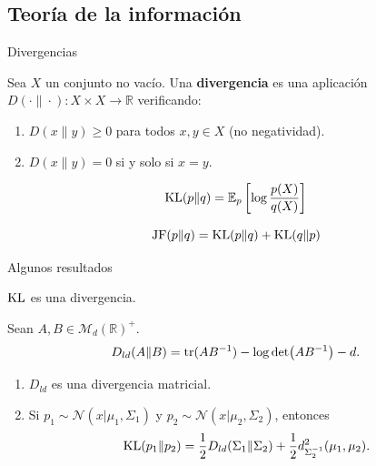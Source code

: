 \documentclass[10pt, compress]{beamer}
\newcommand\R{\mathbb{R}}
\begin{document}
\subsection{Teoría de la información}

\begin{frame}{Divergencias}
  \begin{definition}[Divergencia]
    Sea $X$ un conjunto no vacío. Una \textbf{divergencia} es una aplicación $D(\cdot \| \cdot ) \colon X \times X \to \R$ verificando:
    \begin{enumerate}
      \item $D(x \| y ) \ge 0$ para todos $x, y \in X$ (no negatividad).
      \item $D(x \| y ) = 0$ si y solo si $x = y$. 
    \end{enumerate}
  \end{definition}

  \begin{definition}
    \[\operatorname{KL}(p \| q) = \mathbb{E}_p\left[ \log\frac{p(X)}{q(X)} \right]\]
  \end{definition}

  \begin{definition}
    \[\operatorname{JF}(p \| q) = \operatorname{KL}(p\|q) + \operatorname{KL}(q\|p) \]
  \end{definition}
\end{frame}

\begin{frame}{Algunos resultados}
  \begin{theorem}
    $\operatorname{KL}$ es una divergencia.
  \end{theorem}

  \begin{definition}
    Sean $A, B \in \mathcal{M}_d(\R)^+$.
    \[ D_{ld} (A \| B) = \operatorname{tr}(AB^{-1}) - \log\det(AB^{-1}) - d.\]

  \end{definition}

  \begin{theorem}
    \begin{enumerate}
      \item $D_{ld}$ es una divergencia matricial.
      \item Si $p_1 \sim \mathcal{N}(x|\mu_1,\Sigma_1)$ y $p_2 \sim \mathcal{N}(x|\mu_2,\Sigma_2)$, entonces
      \[ \operatorname{KL}(p_1\|p_2) = \frac{1}{2} D_{ld}(\Sigma_1\|\Sigma_2) + \frac{1}{2}d_{\Sigma_2^{-1}}^2(\mu_1,\mu_2).\]
    \end{enumerate}
  \end{theorem}
\end{frame}
\end{document}
